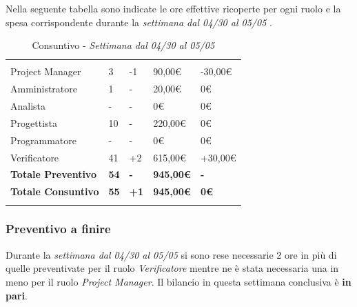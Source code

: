 Nella seguente tabella sono indicate le ore effettive ricoperte per ogni ruolo e la spesa corrispondente durante la \textit{settimana dal 04/30 al 05/05 }.

\label{sec:tabellaConsuntivo2Sett}
\begin{table}[H]
	\centering
	\begin{tabular}{|p{3.8cm}|C{2.6cm}|C{2.9cm}|C{2.7cm}|C{3.3cm}|}
		
		 & & & & \\
		Project Manager & 3 & -1 & 90,00\euro & -30,00\euro \\
		\hline
		Amministratore & 1 & - & 20,00\euro & 0\euro \\
		\hline
		Analista      & - & - & 0\euro & 0\euro \\
		\hline
		Progettista   & 10 & - & 220,00\euro & 0\euro \\
		\hline
		Programmatore & - & - & 0\euro & 0\euro \\
		\hline
		Verificatore  & 41 & +2 & 615,00\euro & +30,00\euro \\
		\textbf{Totale Preventivo} & \textbf{54} & \textbf{-} & \textbf{945,00\euro} & \textbf{-}\\
		\textbf{Totale Consuntivo} & \textbf{55} & \textbf{+1} & \textbf{945,00\euro} & \textbf{0\euro}\\
	\end{tabular}
	\caption{Consuntivo - \textit{Settimana dal 04/30 al 05/05 }}
	
\end{table}

\subsubsection{Preventivo a finire}
Durante la  \textit{settimana dal 04/30 al 05/05} si sono rese necessarie 2 ore in più di quelle preventivate per il ruolo \textit{Verificatore} mentre ne è stata necessaria una in meno per il ruolo \textit{Project Manager}. Il bilancio in questa settimana conclusiva è \textbf{in pari}.





